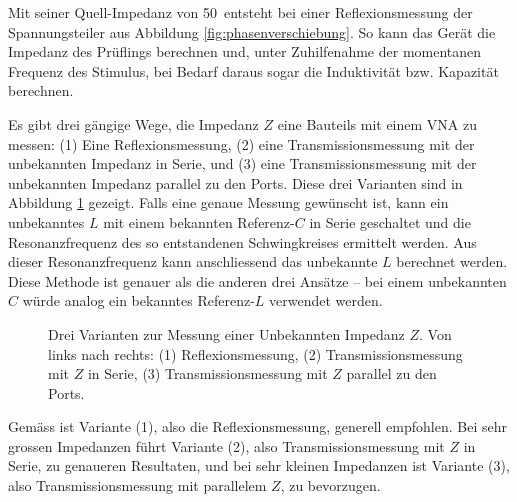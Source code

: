 \documentclass[twoside,a4paper,11pt,halfparskip,DIV=11,notitlepage]{scrartcl}
\begin{document}
Mit seiner Quell-Impedanz von 50~\Ohm entsteht bei einer
Reflexionsmessung der Spannungsteiler aus Abbildung
\ref{fig:phasenverschiebung}. So kann das Gerät die Impedanz des Prüflings
berechnen und, unter Zuhilfenahme der momentanen Frequenz des Stimulus, bei
Bedarf daraus sogar die Induktivität bzw. Kapazität berechnen.

Es gibt drei gängige Wege, die Impedanz $Z$ eine Bauteils mit einem VNA zu messen:
(1) Eine Reflexionsmessung, (2) eine Transmissionsmessung mit der unbekannten
Impedanz in Serie, und (3) eine Transmissionsmessung mit der unbekannten
Impedanz parallel zu den Ports. Diese drei Varianten sind in Abbildung
\ref{fig:impedancemeasurement} gezeigt. Falls eine genaue Messung gewünscht ist,
kann ein unbekanntes $L$ mit einem bekannten Referenz-$C$ in Serie geschaltet
und die Resonanzfrequenz des so entstandenen Schwingkreises ermittelt werden.
Aus dieser Resonanzfrequenz kann anschliessend das unbekannte $L$ berechnet werden.
Diese Methode ist genauer als die anderen drei Ansätze -- bei einem unbekannten
$C$ würde analog ein bekanntes Referenz-$L$ verwendet werden.

\begin{figure}[H]
    \begin{center}
    \end{center}
     \caption{Drei Varianten zur Messung einer Unbekannten Impedanz $Z$. Von
         links nach rechts: (1) Reflexionsmessung, (2) Transmissionsmessung mit $Z$ in
     Serie, (3) Transmissionsmessung mit $Z$ parallel zu den Ports.}
    \label{fig:impedancemeasurement}
\end{figure}

Gemäss \cite{tech2018performing} ist Variante (1), also die Reflexionsmessung, generell
empfohlen. Bei sehr grossen Impedanzen führt Variante (2), also Transmissionsmessung
mit $Z$ in Serie, zu genaueren Resultaten, und bei sehr kleinen Impedanzen
ist Variante (3), also Transmissionsmessung mit parallelem $Z$, zu bevorzugen.
\end{document}
